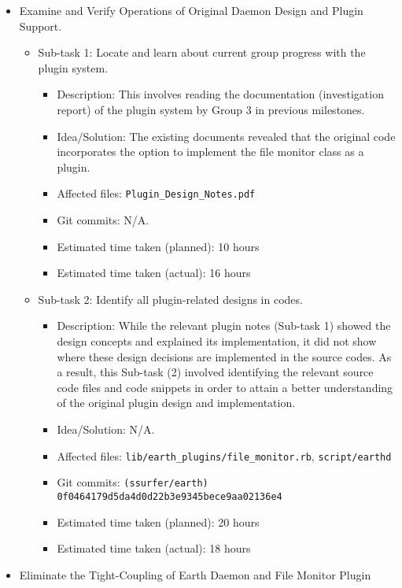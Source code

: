 \begin{itemize}
	\item Examine and Verify Operations of Original Daemon Design and Plugin Support.
		\begin{itemize}
			\item Sub-task 1: Locate and learn about current group progress with the plugin system.
	      	\begin{itemize}
					\item Description: This involves reading the documentation (investigation report) of the plugin system by Group 3 in previous milestones.
					\item Idea/Solution: The existing documents revealed that the original code incorporates the option to implement the file monitor class as a plugin.
					\item Affected files: \texttt{Plugin\_Design\_Notes.pdf}
					\item Git commits: N/A.
					\item Estimated time taken (planned): 10 hours
					\item Estimated time taken (actual): 16 hours
				\end{itemize}
			\item Sub-task 2: Identify all plugin-related designs in codes.
			   \begin{itemize}
					\item Description: While the relevant plugin notes (Sub-task 1) showed the design concepts and explained its implementation, it did not show where these design decisions are implemented in the source codes. As a result, this Sub-task (2) involved identifying the relevant source code files and code snippets in order to attain a better understanding of the original plugin design and implementation. 
					\item Idea/Solution: N/A. 
					\item Affected files: \texttt{lib/earth\_plugins/file\_monitor.rb}, \texttt{script/earthd}
					\item Git commits: \texttt{(ssurfer/earth) 0f0464179d5da4d0d22b3e9345bece9aa02136e4}
					\item Estimated time taken (planned): 20 hours
					\item Estimated time taken (actual): 18 hours
				\end{itemize}
		\end{itemize}
	\item Eliminate the Tight-Coupling of Earth Daemon and File Monitor Plugin
		\begin{itemize}

\end{itemize}
\end{itemize}
